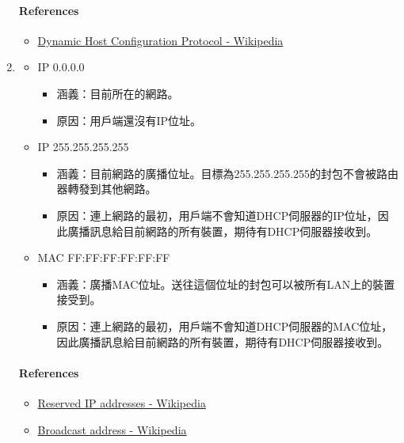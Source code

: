 \documentclass[12pt, a4paper]{article}
\begin{document}
\begin{enumerate}
    \paragraph{References}
    \begin{itemize}
      \item \href{https://en.wikipedia.org/wiki/Dynamic_Host_Configuration_Protocol}{Dynamic Host Configuration Protocol - Wikipedia}
    \end{itemize}
    \item
    \begin{itemize}
      \item IP 0.0.0.0
      \begin{itemize}
        \item 涵義：目前所在的網路。
        \item 原因：用戶端還沒有IP位址。
      \end{itemize}
      \item IP 255.255.255.255
      \begin{itemize}
        \item 涵義：目前網路的廣播位址。目標為255.255.255.255的封包不會被路由器轉發到其他網路。
        \item 原因：連上網路的最初，用戶端不會知道DHCP伺服器的IP位址，因此廣播訊息給目前網路的所有裝置，期待有DHCP伺服器接收到。
      \end{itemize}
      \item MAC FF:FF:FF:FF:FF:FF
      \begin{itemize}
        \item 涵義：廣播MAC位址。送往這個位址的封包可以被所有LAN上的裝置接受到。
        \item 原因：連上網路的最初，用戶端不會知道DHCP伺服器的MAC位址，因此廣播訊息給目前網路的所有裝置，期待有DHCP伺服器接收到。
      \end{itemize}
    \end{itemize}

    \paragraph{References}
    \begin{itemize}
      \item \href{https://en.wikipedia.org/wiki/Reserved_IP_addresses}{Reserved IP addresses - Wikipedia}
      \item \href{https://en.wikipedia.org/wiki/Broadcast_address}{Broadcast address - Wikipedia}
    \end{itemize}


\end{enumerate}
\end{document}

